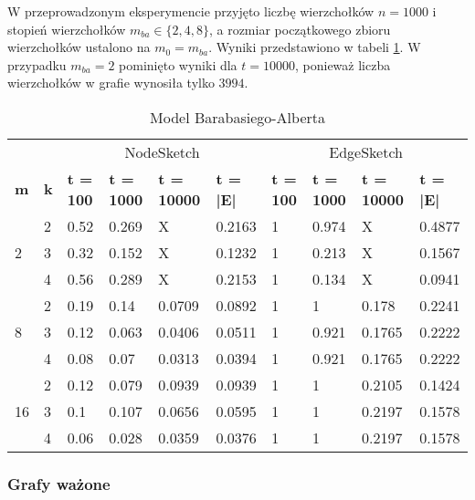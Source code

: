     W przeprowadzonym eksperymencie przyjęto liczbę wierzchołków $n = 1000$ i stopień wierzchołków $m_{ba} \in \{2,4,8\}$, a rozmiar początkowego zbioru wierzchołków ustalono na $m_0 = m_{ba}$. Wyniki przedstawiono w tabeli \ref{tab:barabasi_albert}. W przypadku $m_{ba} = 2$ pominięto wyniki dla $t = 10000$, ponieważ liczba wierzchołków w grafie wynosiła tylko $3994$.
    \begin{table}[!ht]
        \small
        \centering
        \begin{tabular}{|l|l|l|l|l|l|l|l|l|l|}
        \hline
            & & \multicolumn{4}{c|}{NodeSketch} & \multicolumn{4}{c|}{EdgeSketch} \\ \cline{1-10}
            \textbf{m} & \textbf{k} & \textbf{t = 100} & \textbf{t = 1000} & \textbf{t = 10000} & \textbf{t = |E|} & \textbf{t = 100} & \textbf{t = 1000} & \textbf{t = 10000} & \textbf{t = |E|} \\ \hline\hline
            \multirow{3}{*}{2} & 2 & 0.52 & 0.269 & X & 0.2163 & 1 & 0.974 & X & 0.4877 \\ \cline{2-10}
            & 3 & 0.32 & 0.152 & X & 0.1232 & 1 & 0.213 & X & 0.1567 \\ \cline{2-10}
            & 4 & 0.56 & 0.289 & X & 0.2153 & 1 & 0.134 & X & 0.0941 \\ \hline\hline
            \multirow{3}{*}{8} & 2 & 0.19 & 0.14 & 0.0709 & 0.0892 & 1 & 1 & 0.178 & 0.2241 \\ \cline{2-10}
            & 3 & 0.12 & 0.063 & 0.0406 & 0.0511 & 1 & 0.921 & 0.1765 & 0.2222 \\ \cline{2-10}
            & 4 & 0.08 & 0.07 & 0.0313 & 0.0394 & 1 & 0.921 & 0.1765 & 0.2222 \\ \hline\hline
            \multirow{3}{*}{16} & 2 & 0.12 & 0.079 & 0.0939 & 0.0939 & 1 & 1 & 0.2105 & 0.1424 \\ \cline{2-10}
            & 3 & 0.1 & 0.107 & 0.0656 & 0.0595 & 1 & 1 & 0.2197 & 0.1578 \\ \cline{2-10}
            & 4 & 0.06 & 0.028 & 0.0359 & 0.0376 & 1 & 1 & 0.2197 & 0.1578 \\ \hline
        \end{tabular}
        \label{tab:barabasi_albert}
        \caption{Model Barabasiego-Alberta}
    \end{table}

    \subsubsection{Grafy ważone}

